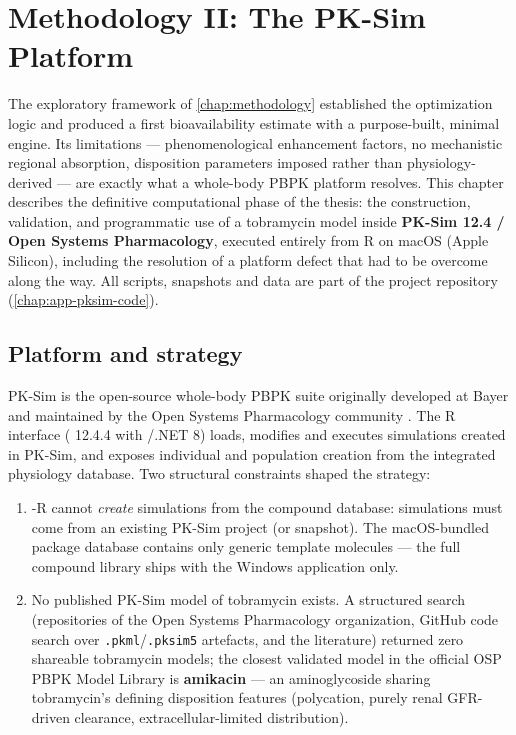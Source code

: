 \chapter{Methodology II: The PK-Sim Platform}
\label{chap:methodology-pksim}

The exploratory framework of \cref{chap:methodology} established the optimization logic and produced a first bioavailability estimate with a purpose-built, minimal engine. Its limitations --- phenomenological enhancement factors, no mechanistic regional absorption, disposition parameters imposed rather than physiology-derived --- are exactly what a whole-body PBPK platform resolves. This chapter describes the definitive computational phase of the thesis: the construction, validation, and programmatic use of a tobramycin model inside \textbf{PK-Sim 12.4 / Open Systems Pharmacology}, executed entirely from R on macOS (Apple Silicon), including the resolution of a platform defect that had to be overcome along the way. All scripts, snapshots and data are part of the project repository (\cref{chap:app-pksim-code}).

\section{Platform and strategy}
\label{sec:pksim-strategy}

PK-Sim is the open-source whole-body PBPK suite originally developed at Bayer and maintained by the Open Systems Pharmacology community \citep{OSP2024}. The R interface ( 12.4.4 with /.NET 8) loads, modifies and executes simulations created in PK-Sim, and exposes individual and population creation from the integrated physiology database. Two structural constraints shaped the strategy:

\begin{enumerate}
\item {}-R cannot \emph{create} simulations from the compound database: simulations must come from an existing PK-Sim project (or snapshot). The macOS-bundled package database contains only generic template molecules --- the full compound library ships with the Windows application only.
\item No published PK-Sim model of tobramycin exists. A structured search (repositories of the Open Systems Pharmacology organization, GitHub code search over \texttt{.pkml}/\texttt{.pksim5} artefacts, and the literature) returned zero shareable tobramycin models; the closest validated model in the official OSP PBPK Model Library is \textbf{amikacin} --- an aminoglycoside sharing tobramycin's defining disposition features (polycation, purely renal GFR-driven clearance, extracellular-limited distribution).
\end{enumerate}

